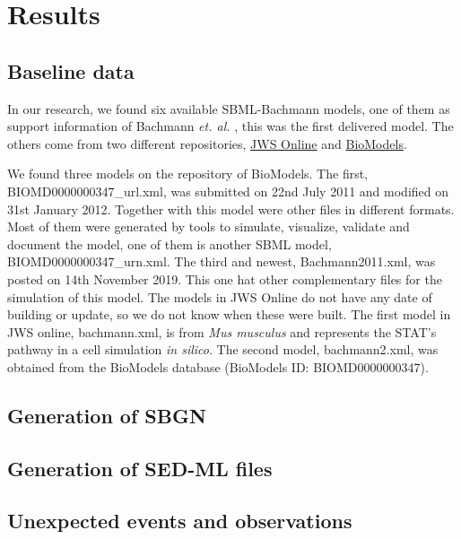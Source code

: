 \section*{Results} \label{resuslt}
\subsection*{Baseline data}
In our research, we found six available SBML-Bachmann models, one of them as support information of Bachmann \textit{et. al.} \cite{bachmannmodel}, this was the first delivered model. The others come from two different repositories, \hyperlink{https://www.systemsmedicine.net/posts/jws-online-biological-systems-modelling}{JWS Online} and \hyperlink{https://www.ebi.ac.uk/biomodels/}{BioModels}.

We found three models on the repository of BioModels. The first, \textsf{BIOMD0000000347\_url.xml}, was submitted on 22nd July 2011 and modified on 31st January 2012. Together with this model were other files in different formats. Most of them were generated by tools to simulate, visualize, validate and document the model, one of them is another SBML model, \textsf{BIOMD0000000347\_urn.xml}. The third and newest, Bachmann2011.xml, was posted on 14th November 2019. This one hat other complementary files for the simulation of this model. The models in JWS Online do not have any date of building or update, so we do not know when these were built. The first model in JWS online, bachmann.xml, is from \textit{Mus musculus} and represents the STAT's pathway in a cell simulation \textit{in silico}. The second model, \textsf{bachmann2.xml}, was obtained from the BioModels database (BioModels ID: BIOMD0000000347).

\subsection*{Generation of SBGN}

\subsection*{Generation of SED-ML files}

\subsection*{Unexpected events and observations}
